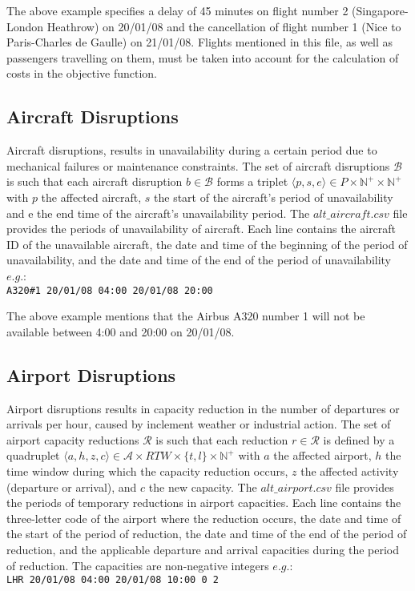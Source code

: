 \documentclass[ijoo,nonblindrev]{informs-ijoo}
\begin{document}
	The above example specifies a delay of 45 minutes on flight number 2 (Singapore-London Heathrow) on 20/01/08 and the cancellation of flight number 1 (Nice to Paris-Charles de Gaulle) on 21/01/08.
	Flights mentioned in this file, as well as passengers travelling on them, must be taken into account for the calculation of costs in the objective function.
	
\subsection{Aircraft Disruptions} \label{subsec:aircraftDisr}

	Aircraft disruptions, results in unavailability during a certain period due to mechanical failures or maintenance constraints. The set of aircraft disruptions $\mathcal{B}$ is such that each aircraft disruption $b \in \mathcal{B}$ forms a triplet $\langle p, s, e \rangle  \in P \times \mathbb{N}^{+} \times \mathbb{N}^{+}$ with $p$ the affected aircraft, $s$ the start of the aircraft's period of unavailability and e the end time of the aircraft's unavailability period.
	The $alt\_aircraft.csv$ file provides the periods of unavailability of aircraft. Each line contains the aircraft ID of the unavailable aircraft, the date and 	time  of the beginning of the period of unavailability, and the date and time of the end of the period of unavailability $e.g.$:\\
	\newline
	{\texttt{\footnotesize A320\#1 20/01/08 04:00 20/01/08 20:00}}
	\newline
	
	The above example mentions that the Airbus A320 number 1 will not be available between 4:00 and 20:00 on 20/01/08.
	
\subsection{Airport Disruptions} \label{subsec:airportDisr}
Airport disruptions results in capacity reduction in the number of departures or arrivals per hour, caused by inclement weather or industrial action. The set of airport capacity reductions $\mathcal{R}$ is such that each reduction $ r \in \mathcal{R}$ is defined by a quadruplet $\langle a, h, z, c\rangle \in \mathcal{A} \times RTW \times {\{t, l\}} \times \mathbb{N}^{+}$  with $a$ the affected airport, $h$ the time window during which the capacity reduction occurs, $z$ the affected activity (departure or arrival), and $c$ the new capacity. 
	The $alt\_airport.csv$ file provides the periods of temporary reductions in airport capacities. Each line contains the three-letter code of the airport where the reduction occurs, the date and time of the start of the period of reduction, the date and time of the end of the period of reduction, and the applicable departure and arrival 	capacities during the period of reduction. The capacities are non-negative integers $e.g.$:\\
	\newline
	{\texttt{\footnotesize LHR 20/01/08 04:00 20/01/08 10:00 0 2}}
	\newline
	
\end{document}
